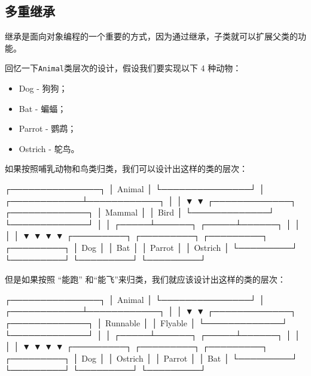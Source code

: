 \hypertarget{ux591aux91cdux7ee7ux627f}{%
\subsection{多重继承}\label{ux591aux91cdux7ee7ux627f}}

继承是面向对象编程的一个重要的方式，因为通过继承，子类就可以扩展父类的功能。

回忆一下\texttt{Animal}类层次的设计，假设我们要实现以下 4 种动物：

\begin{itemize}
\item
  Dog - 狗狗；
\item
  Bat - 蝙蝠；
\item
  Parrot - 鹦鹉；
\item
  Ostrich - 鸵鸟。
\end{itemize}

如果按照哺乳动物和鸟类归类，我们可以设计出这样的类的层次：

\begin{pythoncode}
                ┌───────────────┐
                │    Animal     │
                └───────────────┘
                        │
           ┌────────────┴────────────┐
           │                         │
           ▼                         ▼
    ┌─────────────┐           ┌─────────────┐
    │   Mammal    │           │    Bird     │
    └─────────────┘           └─────────────┘
           │                         │
     ┌─────┴──────┐            ┌─────┴──────┐
     │            │            │            │
     ▼            ▼            ▼            ▼
┌─────────┐  ┌─────────┐  ┌─────────┐  ┌─────────┐
│   Dog   │  │   Bat   │  │ Parrot  │  │ Ostrich │
└─────────┘  └─────────┘  └─────────┘  └─────────┘
\end{pythoncode}

但是如果按照 ``能跑'' 和``能飞''来归类，我们就应该设计出这样的类的层次：

\begin{pythoncode}
                ┌───────────────┐
                │    Animal     │
                └───────────────┘
                        │
           ┌────────────┴────────────┐
           │                         │
           ▼                         ▼
    ┌─────────────┐           ┌─────────────┐
    │  Runnable   │           │   Flyable   │
    └─────────────┘           └─────────────┘
           │                         │
     ┌─────┴──────┐            ┌─────┴──────┐
     │            │            │            │
     ▼            ▼            ▼            ▼
┌─────────┐  ┌─────────┐  ┌─────────┐  ┌─────────┐
│   Dog   │  │ Ostrich │  │ Parrot  │  │   Bat   │
└─────────┘  └─────────┘  └─────────┘  └─────────┘
\end{pythoncode}

